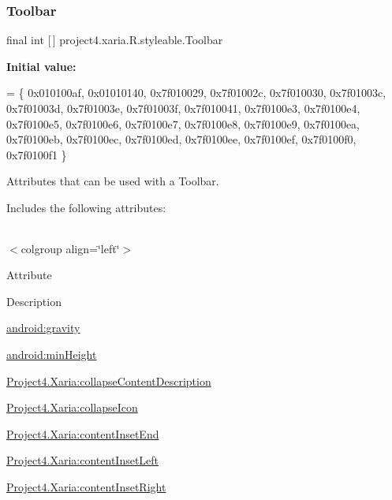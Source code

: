 \subsubsection{\texorpdfstring{Toolbar}{Toolbar}}
{\footnotesize\ttfamily final int \mbox{[}$\,$\mbox{]} project4.\+xaria.\+R.\+styleable.\+Toolbar\hspace{0.3cm}{\ttfamily [static]}}

{\bfseries Initial value\+:}
\begin{DoxyCode}
= \{
            0x010100af, 0x01010140, 0x7f010029, 0x7f01002c,
            0x7f010030, 0x7f01003c, 0x7f01003d, 0x7f01003e,
            0x7f01003f, 0x7f010041, 0x7f0100e3, 0x7f0100e4,
            0x7f0100e5, 0x7f0100e6, 0x7f0100e7, 0x7f0100e8,
            0x7f0100e9, 0x7f0100ea, 0x7f0100eb, 0x7f0100ec,
            0x7f0100ed, 0x7f0100ee, 0x7f0100ef, 0x7f0100f0,
            0x7f0100f1
        \}
\end{DoxyCode}
Attributes that can be used with a Toolbar. 

Includes the following attributes\+:

\tabulinesep=1mm
\begin{longtabu} spread 0pt [c]{*{0}{|X[-1]}|}
\hline
\end{longtabu}
$<$colgroup align=\char`\"{}left\char`\"{}$>$ 

Attribute

Description 

{\ttfamily \hyperlink{classproject4_1_1xaria_1_1R_1_1styleable_aaa01afab589b8e590f5d025a28cf7404}{android\+:gravity}}

{\ttfamily \hyperlink{classproject4_1_1xaria_1_1R_1_1styleable_ac5a3d253c3d18c7ab741bcfc47232df4}{android\+:min\+Height}}

{\ttfamily \hyperlink{classproject4_1_1xaria_1_1R_1_1styleable_a98b1b074efe3a521e01cbddeaaf5da0f}{Project4.\+Xaria\+:collapse\+Content\+Description}}

{\ttfamily \hyperlink{classproject4_1_1xaria_1_1R_1_1styleable_a2cf454b5f11a8dc6f39c763c9a877b20}{Project4.\+Xaria\+:collapse\+Icon}}

{\ttfamily \hyperlink{classproject4_1_1xaria_1_1R_1_1styleable_a57f6aadbc973e24685a86eedaafd5f4c}{Project4.\+Xaria\+:content\+Inset\+End}}

{\ttfamily \hyperlink{classproject4_1_1xaria_1_1R_1_1styleable_a2660e1510b54665063d64211023b050f}{Project4.\+Xaria\+:content\+Inset\+Left}}

{\ttfamily \hyperlink{classproject4_1_1xaria_1_1R_1_1styleable_a52a6ed0d0c3dfe919f77ed1729daf3f9}{Project4.\+Xaria\+:content\+Inset\+Right}}

